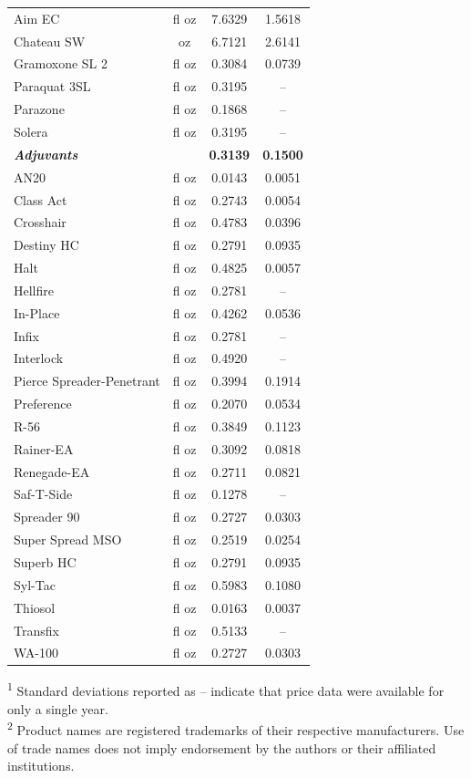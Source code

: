 \documentclass[10pt,a4paper]{article}
\begin{document}
\begin{table}[ht]
\begin{tabular}{lccc}
\hline
Aim EC & fl oz & 7.6329 & 1.5618 \\
Chateau SW & oz & 6.7121 & 2.6141 \\
Gramoxone SL 2 & fl oz & 0.3084 & 0.0739 \\
Paraquat 3SL & fl oz & 0.3195 & -- \\
Parazone & fl oz & 0.1868 & -- \\
Solera & fl oz & 0.3195 & -- \\
\hline
\textbf{\textit{Adjuvants}} & & \textbf{0.3139} & \textbf{0.1500} \\
\hline
AN20 & fl oz & 0.0143 & 0.0051 \\
Class Act & fl oz & 0.2743 & 0.0054 \\
Crosshair & fl oz & 0.4783 & 0.0396 \\
Destiny HC & fl oz & 0.2791 & 0.0935 \\
Halt & fl oz & 0.4825 & 0.0057 \\
Hellfire & fl oz & 0.2781 & -- \\
In-Place & fl oz & 0.4262 & 0.0536 \\
Infix & fl oz & 0.2781 & -- \\
Interlock & fl oz & 0.4920 & -- \\
Pierce Spreader-Penetrant & fl oz & 0.3994 & 0.1914 \\
Preference & fl oz & 0.2070 & 0.0534 \\
R-56 & fl oz & 0.3849 & 0.1123 \\
Rainer-EA & fl oz & 0.3092 & 0.0818 \\
Renegade-EA & fl oz & 0.2711 & 0.0821 \\
Saf-T-Side & fl oz & 0.1278 & -- \\
Spreader 90 & fl oz & 0.2727 & 0.0303 \\
Super Spread MSO & fl oz & 0.2519 & 0.0254 \\
Superb HC & fl oz & 0.2791 & 0.0935 \\
Syl-Tac & fl oz & 0.5983 & 0.1080 \\
Thiosol & fl oz & 0.0163 & 0.0037 \\
Transfix & fl oz & 0.5133 & -- \\
WA-100 & fl oz & 0.2727 & 0.0303 \\
\hline
\end{tabular}
\vspace{4pt}
\par
\raggedright
\scriptsize
\textsuperscript{1} Standard deviations reported as -- indicate that price data were available for only a single year. \\
\textsuperscript{2} Product names are registered trademarks of their respective manufacturers. Use of trade names does not imply endorsement by the authors or their affiliated institutions.
\end{table}
\end{document}
